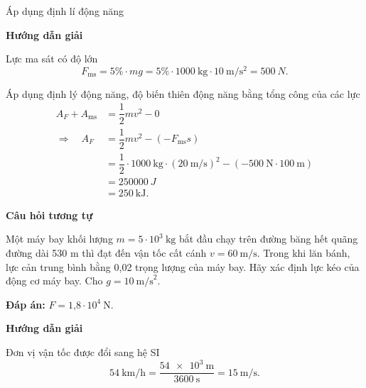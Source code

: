 \begin{dang}{Áp dụng định lí động năng}
	{	\begin{center}
			\textbf{Hướng dẫn giải}
		\end{center}
		
		Lực ma sát có độ lớn 
		$$F_\text{ms} = 5\%\cdot mg = 5\%\cdot\SI{1000}{\kilogram}\cdot\SI{10}{\meter/\second^2}=\SI{500}{N}.$$
		
		Áp dụng định lý động năng, độ biến thiên động năng bằng tổng công của các lực 
		\begin{align*}
			A_F + A_\text{ms} &= \dfrac{1}{2}mv^2 - 0\\ \Rightarrow\quad A_F &= \dfrac{1}{2} mv^2 - (-F_\text{ms}s) \\
			&=\dfrac{1}{2}\cdot\SI{1000}{\kilogram}\cdot(\SI{20}{\meter/\second})^2-(-\SI{500}{\newton}\cdot\SI{100}{\meter})\\
			&= \SI{250000}{J}\\
			&=\SI{250}{\kilo\joule}.		
		\end{align*}
		
		
		\begin{center}
			\textbf{Câu hỏi tương tự}
		\end{center}
		
		Một máy bay khối lượng $m = 5 \cdot 10^3\ \text{kg}$ bắt đầu chạy trên đường băng hết quãng đường dài 530 m thì đạt đến vận tốc cất cánh $v=60\ \text{m/s}$. Trong khi lăn bánh, lực cản trung bình bằng 0,02 trọng lượng của máy bay. Hãy xác định lực kéo của động cơ máy bay. Cho $g=10\ \text{m/s}^2$.
		
		\textbf{Đáp án:} $F = \text{1,8}\cdot 10^4\ \text{N}$.
	}
	{\begin{center}
			\textbf{Hướng dẫn giải}
		\end{center}
		Đơn vị vận tốc được đổi sang hệ SI $$\SI{54}{\kilo\meter/\hour}=\dfrac{\SI{54e3}{\meter}}{\SI{3600}{\second}}=\SI{15}{\meter/\second}.$$
		
}
\end{dang}
